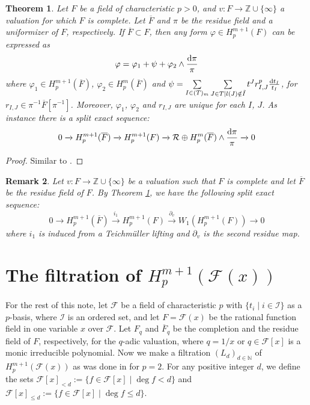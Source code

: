 \documentclass[times,10pt]{amsart}
\newcommand{\N}{\ensuremath{\mathbb{N}}}
\newcommand{\Z}{\ensuremath{\mathbb{Z}}}
\newcommand{\dd}{{\rm d}}
\newcommand{\F}{\ensuremath{\mathcal{F}}}
\newcommand{\I}{\ensuremath{\mathcal{I}}}
\newcommand{\R}{\ensuremath{\mathcal{R}}}
\newcommand{\n}{\ensuremath{\infty}}
\renewcommand{\phi}{\varphi}
\newtheorem{thm}{Theorem}[section]
\newtheorem{rem}[thm]{Remark}%
\begin{document}
  \begin{thm}\label{thd1}
      Let  $F$ be a field of characteristic $p>0$, and $v: F\xrightarrow{} \Z\cup{\{\infty\}}$ a valuation {for which} $F$ is complete. Let $\overline{F}$ and  $\pi$  be the residue field  and a uniformizer  of $F$, respectively.  If $\overline{F}\subset F$, then    any form $\phi\in H_p^{m+1}( F)$ can be expressed as  $$  \phi= \phi_1+ \psi+ \phi_2\wedge \frac{\dd \pi}{\pi}$$ where $\phi_1\in H_p^{m+1}(\overline{F})$, $\phi_2\in H_p^m(\overline{F})$ and $\psi= \sum\limits_{I\in (T)_m}\sum\limits_{J\in T\mid l(J)\notin \tilde{I} } t^J r^p_{I,J} \frac{\dd t_I}{ t_I}$, for $r_{I,J}\in \pi^{-1}\overline{F}[\pi^{-1}]$.  Moreover,  $\phi_1$, $\phi_2$ and $r_{I,J}$ are unique for each $I$, $J$. As instance there is a split exact sequence:$$  0\xrightarrow{} H_p^{m+1}(\overline{F})\xrightarrow{}  H_p^{m+1}(F)\xrightarrow{}  \R\oplus H_p^m(\overline{F})\wedge \frac{\dd \pi}{\pi}\xrightarrow{}0$$ 
  \end{thm}
\begin{proof}
    Similar to \cite[Theorem 2.5]{ex}.
\end{proof} 
  \begin{rem}\label{rex} Let  $v:F\xrightarrow{}\Z\cup\{\n\}$ be a valuation such that $F$ is complete and let $\overline{F}$ be the residue field of $F$. By Theorem \ref{thd1}, we have the following split exact sequence: $$  0\xrightarrow{} H_p^{m+1}(\overline{F})\xrightarrow{i_1} H_p^{m+1}(F)\xrightarrow{\partial_{v}} W_1(H_p^{m+1}(F))\xrightarrow{} 0$$  
      where $i_1$ is induced from a Teichm\"uller lifting and  $\partial_{v}$ is the  second residue map.  
  \end{rem}



  \section{The filtration of $ H_p^{m+1}( \F(x))$}\label{5sts}
  
For the rest of this {note},   let $\F$ be a field of characteristic $p$  with $\{ t_i\mid i\in \I\}$ as a $p$-basis, where $\I$ is an  ordered set, and {let  $F=\F(x)$ be the rational function field in one variable $x$ over $\F$}. Let $F_q$ and $\overline{F}_q$ be the completion and the  residue field of $F$, respectively, for the $q$-adic valuation, where $q=1/x$ or  $q\in \F[x]$ is a monic  irreducible polynomial. Now we make a filtration $(L_d)_{d\in \N}$ of  $H_p^{m+1}(\F(x))$ as was done {in \cite[Section 3]{ex}}   for $p=2$.   For any positive integer $d$,  we define the sets  $\F[x]_{<d}:= \{ f\in \F[x]\mid \deg f<d\}$  and $\F[x]_{\leq d}:= \{ f\in \F[x]\mid \deg f\leq d\}$.
\end{document}
